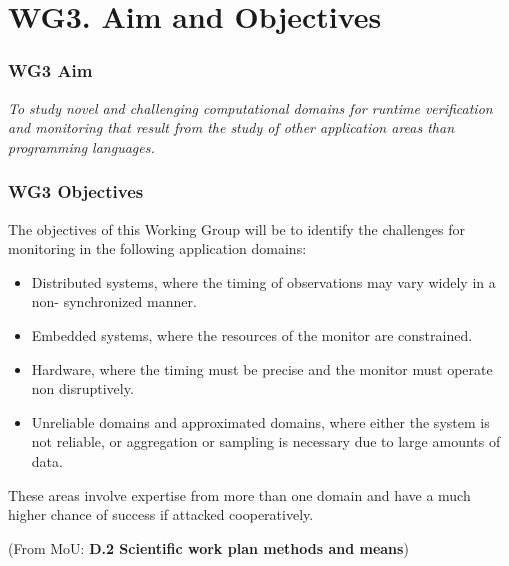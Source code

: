 \documentclass{beamer}
\begin{document}
\section{WG3. Aim and Objectives}

\begin{frame} 
  \frametitle{WG3 Aim}
  \Large
  
  \textit{To study novel and challenging computational domains for
    runtime verification and monitoring that result from the study of
    other application areas than programming languages.}
\end{frame}

\begin{frame} 
  \frametitle{WG3 Objectives}
  
  The objectives of this Working Group will be to identify the
  challenges for monitoring in the following application domains:
  \begin{itemize}
  \item \alert{Distributed systems}, where the timing of observations may vary
    widely in a non- synchronized manner.
  \item \alert{Embedded systems}, where the resources of the monitor
    are constrained.
  \item \alert{Hardware}, where the timing must be precise and the
    monitor must operate non disruptively.
  \item \alert{Unreliable} domains and \alert{approximated} domains,
    where either the system is not reliable, or aggregation or
    sampling is necessary due to large amounts of data.  
  \end{itemize}
  These areas involve expertise from more than one domain and have a
  much higher chance of success if attacked cooperatively.

  \bigskip

  {\small (From MoU: \textbf{D.2 Scientific work plan methods and means})}
  
\end{frame}
\end{document}
